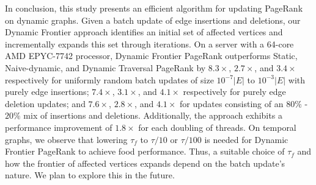 In conclusion, this study presents an efficient algorithm for updating PageRank on dynamic graphs. Given a batch update of edge insertions and deletions, our Dynamic Frontier approach identifies an initial set of affected vertices and incrementally expands this set through iterations. On a server with a 64-core AMD EPYC-7742 processor, Dynamic Frontier PageRank outperforms Static, Naive-dynamic, and Dynamic Traversal PageRank by $8.3\times$, $2.7\times$, and $3.4\times$ respectively for uniformly random batch updates of size $10^{-7}|E|$ to $10^{-3}|E|$ with purely edge insertions; $7.4\times$, $3.1\times$, and $4.1\times$ respectively for purely edge deletion updates; and $7.6\times$, $2.8\times$, and $4.1\times$ for updates consisting of an $80\%$ - $20\%$ mix of insertions and deletions. Additionally, the approach exhibits a performance improvement of $1.8\times$ for each doubling of threads. On temporal graphs, we observe that lowering $\tau_f$ to $\tau / 10$ or $\tau / 100$ is needed for Dynamic Frontier PageRank to achieve food performance. Thus, a suitable choice of $\tau_f$ and how the frontier of affected vertices expands depend on the batch update's nature. We plan to explore this in the future.
